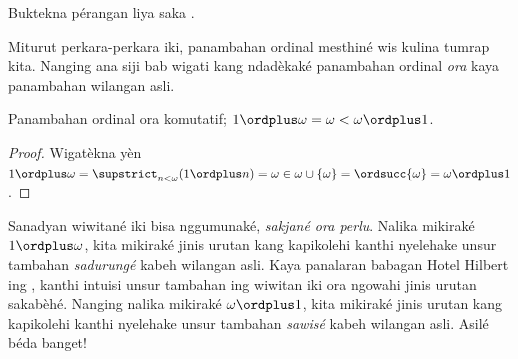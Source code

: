\documentclass[../../../include/open-logic-section]{subfiles}
\begin{document}
\begin{prob}
Buktekna pérangan liya saka
.
\end{prob}

Miturut perkara-perkara iki, panambahan ordinal mesthiné wis
kulina tumrap kita. Nanging ana siji bab wigati kang ndadèkaké
panambahan ordinal \emph{ora} kaya panambahan wilangan asli.

\begin{prop}
Panambahan ordinal {ora} komutatif; $1 \ordplus  \omega = \omega <
\omega \ordplus  1$.
\end{prop}

\begin{proof}
Wigatèkna yèn $1 \ordplus  \omega = \supstrict_{n < \omega} (1 \ordplus n)
= \omega \in \omega \cup \{\omega\} = \ordsucc{\omega} = \omega
\ordplus  1$.
\end{proof}
\noindent
Sanadyan wiwitané iki bisa nggumunaké, \emph{sakjané ora perlu}.
Nalika mikiraké $1 \ordplus \omega$, kita mikiraké jinis urutan kang
kapikolehi kanthi nyelehake unsur tambahan \emph{sadurungé}
kabeh wilangan asli. Kaya panalaran babagan Hotel Hilbert ing
, kanthi intuisi unsur tambahan
ing wiwitan iki ora ngowahi jinis urutan sakabèhé. Nanging nalika
mikiraké $\omega \ordplus 1$, kita mikiraké jinis urutan kang
kapikolehi kanthi nyelehake unsur tambahan \emph{sawisé}
kabeh wilangan asli. Asilé béda banget!
\end{document}
